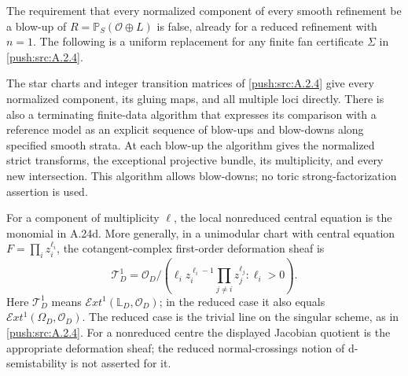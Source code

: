 \begin{proposition}\label{push:src:A.2.5}\label{push:A25}

The requirement that every normalized component of every
smooth refinement be a blow-up of
$R=\mathbb P_S(\mathcal O\oplus L)$ is false, already
for a reduced refinement with $n=1$.
The following is a uniform replacement for any finite
fan certificate $\Sigma$ in \ref{push:src:A.2.4}.

The star charts and integer transition matrices of \ref{push:src:A.2.4}
give every normalized component, its gluing maps, and
all multiple loci directly. There is also a terminating
finite-data algorithm that expresses its comparison
with a reference model as an explicit sequence of
blow-ups and blow-downs along specified smooth strata.
At each blow-up the algorithm gives the normalized
strict transforms, the exceptional projective bundle,
its multiplicity, and every new intersection.
This algorithm allows blow-downs; no toric
strong-factorization assertion is used.

For a component of multiplicity $\ell$, the local
nonreduced central equation is the monomial in A.24d.
More generally, in a unimodular chart with central
equation $F=\prod_i z_i^{\ell_i}$, the cotangent-complex
first-order deformation sheaf is
\[
 \mathcal T^1_D
  =\mathcal O_D\Big/
    \left(\ell_i z_i^{\ell_i-1}
          \prod_{j\ne i}z_j^{\ell_j}:\ell_i>0\right).
 \tag{A.25a}
\]
Here $\mathcal T^1_D$ means
$\mathcal Ext^1(\mathbb L_D,\mathcal O_D)$; in the
reduced case it also equals
$\mathcal Ext^1(\Omega_D,\mathcal O_D)$.
The reduced case is the trivial line on the singular
scheme, as in \ref{push:src:A.2.4}. For a nonreduced centre the displayed
Jacobian quotient is the appropriate deformation sheaf;
the reduced normal-crossings notion of d-semistability
is not asserted for it.
\end{proposition}


